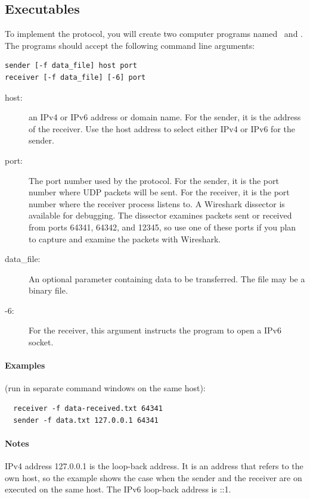\documentclass[12pt]{book}
\begin{document}
\begin{enumerate}[label=\arabic*.]
\subsection{Executables}\label{proto-exe.se}

To implement the protocol, you will create two computer programs named \sender\ and \receiver. The programs should accept the following command line arguments:

\begin{verbatim}
sender [-f data_file] host port
receiver [-f data_file] [-6] port
\end{verbatim}

\begin{description}
\item[host:] an IPv4 or IPv6 address or domain name. For the sender, it is the address of the receiver. Use the host address to select either IPv4 or IPv6 for the sender.
\item [port:] The port number used by the protocol. For the sender, it is the port number where UDP packets will be sent. For the receiver, it is the port number where the receiver process listens to. A Wireshark dissector is available for debugging.  The dissector examines packets sent or received from ports 64341, 64342, and 12345, so use one of these ports if you plan to capture and examine the packets with Wireshark.
\item [data\_file:] An optional parameter containing data to be transferred. The file may be a binary file.
\item [-6:] For the receiver, this argument instructs the program to open a IPv6 socket.
\end{description}

\paragraph{Examples} (run in separate command windows on the same host):
\begin{verbatim}
  receiver -f data-received.txt 64341
  sender -f data.txt 127.0.0.1 64341
\end{verbatim}

\paragraph{Notes} IPv4 address 127.0.0.1  is the loop-back address. It is an address that refers to the own host, so the example shows the case when the sender and the receiver are on executed on the same host. The IPv6 loop-back address is ::1.



\end{enumerate}
\end{document}

